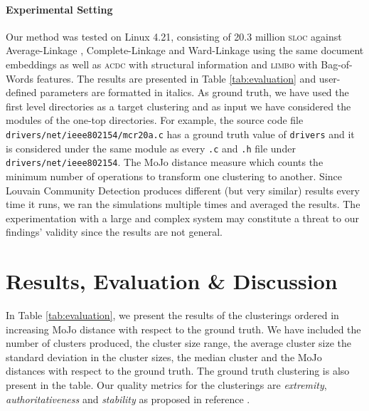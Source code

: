 \documentclass[sigconf]{acmart}
\begin{document}
\paragraph{Experimental Setting} Our method was tested on Linux 4.21,
consisting of 20.3 million \textsc{sloc} against Average-Linkage \cite{average}, Complete-Linkage \cite{complete} 
and Ward-Linkage \cite{ward} using the same document embeddings
as well as \textsc{acdc} with structural information \cite{acdc} and \textsc{limbo} \cite{limbo} with Bag-of-Words features. The results are presented in Table \ref{tab:evaluation} and user-defined parameters are formatted in italics. 
As ground truth, we have used the first level directories as a target clustering and as input we have considered 
the modules of the one-top directories. 
For example, the source code file \texttt{drivers/net/ieee802154\-/mcr20a.c} has a ground truth value of \texttt{drivers} 
and it is considered under the same module as every \texttt{.c} and \texttt{.h} file under \texttt{drivers/net/ieee802154}. 
The MoJo distance measure which counts the minimum number of operations to transform one clustering to another.  
Since Louvain Community Detection produces  different (but very similar) results every time it runs, we ran the simulations 
multiple times and averaged the results. 
The experimentation with a large and complex system may constitute a threat to our findings' validity since the results are not general.  


\section{Results, Evaluation \& Discussion}

In Table \ref{tab:evaluation}, we present the results of the clusterings ordered in increasing MoJo distance 
with respect to the ground truth. 
We have included the number of clusters produced, the cluster size range, the average cluster size the standard
deviation in the cluster sizes, the median cluster and the MoJo distances with respect to the ground truth. 
The ground truth clustering is also present in the table. 
Our quality metrics for the clusterings are 
\emph{extremity}, \emph{authoritativeness} and \emph{stability} as proposed in reference \cite{evaluation}.
\end{document}
